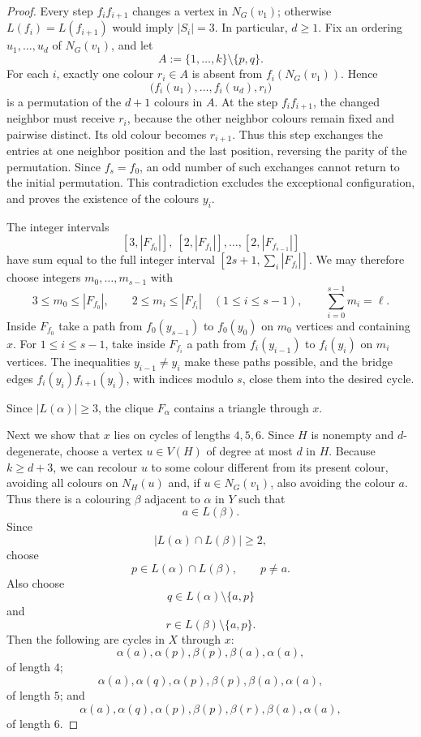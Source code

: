 \documentclass[11pt]{article}
\theoremstyle{remark}
\numberwithin{equation}{section}
\numberwithin{table}{section}
\begin{document}
\begin{proof}
Every step $f_if_{i+1}$ changes a vertex in $N_G(v_1)$; otherwise
$L(f_i)=L(f_{i+1})$ would imply $|S_i|=3$. In particular, $d\ge1$.
Fix an ordering $u_1,\ldots,u_d$ of $N_G(v_1)$, and let
\[
A:=\{1,\ldots,k\}\setminus\{p,q\}.
\]
For each $i$, exactly one colour $r_i\in A$ is absent from
$f_i(N_G(v_1))$. Hence
\[
\bigl(f_i(u_1),\ldots,f_i(u_d),r_i\bigr)
\]
is a permutation of the $d+1$ colours in $A$. At the step
$f_if_{i+1}$, the changed neighbor must receive $r_i$, because the
other neighbor colours remain fixed and pairwise distinct. Its old
colour becomes $r_{i+1}$. Thus this step exchanges the entries at one
neighbor position and the last position, reversing the parity of the
permutation. Since $f_s=f_0$, an odd number of such exchanges cannot
return to the initial permutation. This contradiction excludes the
exceptional configuration, and proves the existence of the colours
$y_i$.

The integer intervals
\[
[3,|F_{f_0}|],\ [2,|F_{f_1}|],\ldots,[2,|F_{f_{s-1}}|]
\]
have sum equal to the full integer interval
$[2s+1,\sum_i |F_{f_i}|]$. We may therefore choose integers
$m_0,\ldots,m_{s-1}$ with
\[
3\le m_0\le |F_{f_0}|,\qquad
2\le m_i\le |F_{f_i}|\quad (1\le i\le s-1),\qquad
\sum_{i=0}^{s-1}m_i=\ell.
\]
Inside $F_{f_0}$ take a path from $f_0(y_{s-1})$ to $f_0(y_0)$ on
$m_0$ vertices and containing $x$. For $1\le i\le s-1$, take inside
$F_{f_i}$ a path from $f_i(y_{i-1})$ to $f_i(y_i)$ on $m_i$ vertices.
The inequalities $y_{i-1}\ne y_i$ make these paths possible, and the
bridge edges $f_i(y_i)f_{i+1}(y_i)$, with indices modulo $s$, close
them into the desired cycle.

\smallskip

Since $|L(\alpha)|\ge3$, the clique $F_\alpha$ contains a triangle
through $x$.

Next we show that $x$ lies on cycles of lengths $4,5,6$.
Since $H$ is nonempty and $d$-degenerate, choose a vertex $u\in V(H)$
of degree at most $d$ in $H$. Because $k\ge d+3$, we can recolour $u$
to some colour different from its present colour, avoiding all colours on
$N_H(u)$ and, if $u\in N_G(v_1)$, also avoiding the colour $a$.
Thus there is a colouring $\beta$ adjacent to $\alpha$ in $Y$ such that
\[
a\in L(\beta).
\]
Since
\[
|L(\alpha)\cap L(\beta)|\ge 2,
\]
choose
\[
p\in L(\alpha)\cap L(\beta),\qquad p\ne a.
\]
Also choose
\[
q\in L(\alpha)\setminus\{a,p\}
\]
and
\[
r\in L(\beta)\setminus\{a,p\}.
\]
Then the following are cycles in $X$ through $x$:
\[
\alpha(a),\alpha(p),\beta(p),\beta(a),\alpha(a),
\]
of length $4$;
\[
\alpha(a),\alpha(q),\alpha(p),\beta(p),\beta(a),\alpha(a),
\]
of length $5$; and
\[
\alpha(a),\alpha(q),\alpha(p),\beta(p),\beta(r),\beta(a),\alpha(a),
\]
of length $6$.


\end{proof}
\end{document}
